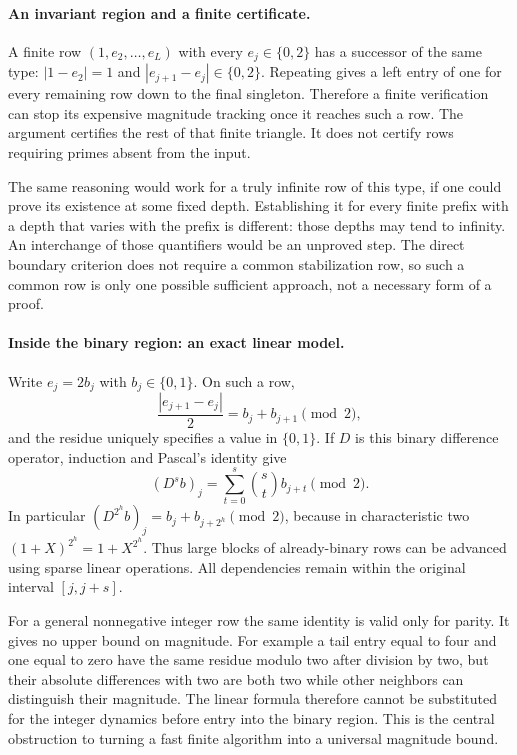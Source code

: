 \documentclass[11pt,a4paper]{article}
\begin{document}
\paragraph{An invariant region and a finite certificate.}
A finite row $(1,e_2,\ldots,e_L)$ with every $e_j\in\{0,2\}$
has a successor of the same type: $|1-e_2|=1$ and
$|e_{j+1}-e_j|\in\{0,2\}$. Repeating gives a left entry of one
for every remaining row down to the final singleton. Therefore a finite
verification can stop its expensive magnitude tracking once it reaches
such a row. The argument certifies the rest of that finite triangle.
It does not certify rows requiring primes absent from the input.

The same reasoning would work for a truly infinite row of this type,
if one could prove its existence at some fixed depth. Establishing it
for every finite prefix with a depth that varies with the prefix is
different: those depths may tend to infinity. An interchange of those
quantifiers would be an unproved step. The direct boundary criterion
does not require a common stabilization row, so such a common row is
only one possible sufficient approach, not a necessary form of a proof.

\paragraph{Inside the binary region: an exact linear model.}
Write $e_j=2b_j$ with $b_j\in\{0,1\}$. On such a row,
\[
 \frac{|e_{j+1}-e_j|}{2}
   =b_j+b_{j+1}\pmod2,
\]
and the residue uniquely specifies a value in $\{0,1\}$. If $D$ is
this binary difference operator, induction and Pascal's identity give
\[
 (D^s b)_j=\sum_{t=0}^s\binom{s}{t}b_{j+t}\pmod2.
\]
In particular $(D^{2^h}b)_j=b_j+b_{j+2^h}\pmod2$, because in
characteristic two $(1+X)^{2^h}=1+X^{2^h}$. Thus large blocks of
already-binary rows can be advanced using sparse linear operations.
All dependencies remain within the original interval $[j,j+s]$.

For a general nonnegative integer row the same identity is valid only
for parity. It gives no upper bound on magnitude. For example a tail
entry equal to four and one equal to zero have the same residue modulo
two after division by two, but their absolute differences with two are
both two while other neighbors can distinguish their magnitude. The
linear formula therefore cannot be substituted for the integer dynamics
before entry into the binary region. This is the central obstruction to
turning a fast finite algorithm into a universal magnitude bound.
\end{document}
